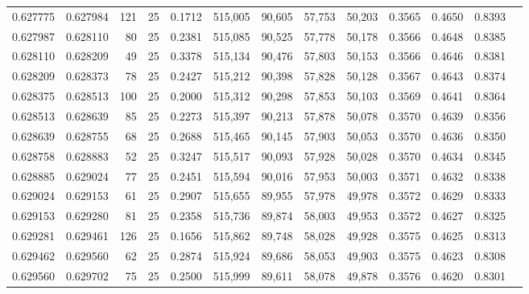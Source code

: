 \begin{tabular}{rrrrrrrrrrrrr}
0.627775 & 0.627984 &   121 &  25 &                                     0.1712 & 515,005 &  90,605 &  57,753 &  50,203 & 0.3565 & 0.4650 & 0.8393 \\
0.627987 & 0.628110 &    80 &  25 &                                     0.2381 & 515,085 &  90,525 &  57,778 &  50,178 & 0.3566 & 0.4648 & 0.8385 \\
0.628110 & 0.628209 &    49 &  25 &                                     0.3378 & 515,134 &  90,476 &  57,803 &  50,153 & 0.3566 & 0.4646 & 0.8381 \\
0.628209 & 0.628373 &    78 &  25 &                                     0.2427 & 515,212 &  90,398 &  57,828 &  50,128 & 0.3567 & 0.4643 & 0.8374 \\
0.628375 & 0.628513 &   100 &  25 &                                     0.2000 & 515,312 &  90,298 &  57,853 &  50,103 & 0.3569 & 0.4641 & 0.8364 \\
0.628513 & 0.628639 &    85 &  25 &                                     0.2273 & 515,397 &  90,213 &  57,878 &  50,078 & 0.3570 & 0.4639 & 0.8356 \\
0.628639 & 0.628755 &    68 &  25 &                                     0.2688 & 515,465 &  90,145 &  57,903 &  50,053 & 0.3570 & 0.4636 & 0.8350 \\
0.628758 & 0.628883 &    52 &  25 &                                     0.3247 & 515,517 &  90,093 &  57,928 &  50,028 & 0.3570 & 0.4634 & 0.8345 \\
0.628885 & 0.629024 &    77 &  25 &                                     0.2451 & 515,594 &  90,016 &  57,953 &  50,003 & 0.3571 & 0.4632 & 0.8338 \\
0.629024 & 0.629153 &    61 &  25 &                                     0.2907 & 515,655 &  89,955 &  57,978 &  49,978 & 0.3572 & 0.4629 & 0.8333 \\
0.629153 & 0.629280 &    81 &  25 &                                     0.2358 & 515,736 &  89,874 &  58,003 &  49,953 & 0.3572 & 0.4627 & 0.8325 \\
0.629281 & 0.629461 &   126 &  25 &                                     0.1656 & 515,862 &  89,748 &  58,028 &  49,928 & 0.3575 & 0.4625 & 0.8313 \\
0.629462 & 0.629560 &    62 &  25 &                                     0.2874 & 515,924 &  89,686 &  58,053 &  49,903 & 0.3575 & 0.4623 & 0.8308 \\
0.629560 & 0.629702 &    75 &  25 &                                     0.2500 & 515,999 &  89,611 &  58,078 &  49,878 & 0.3576 & 0.4620 & 0.8301 \\

\end{tabular}
